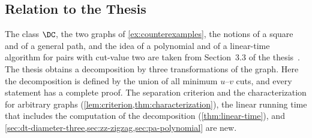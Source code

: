 \subsection{Relation to the Thesis}\label{sec:thesis}

The class $\DC$, the two graphs of \cref{ex:counterexamples}, the notions of a square and of a general path, and the idea of a polynomial and of a linear-time algorithm for pairs with cut-value two are taken from Section~3.3 of the thesis~\cite[Definitions~37 to~40 and Theorems~20, 22 and~23]{Michel2025MinCutPath}.
The thesis obtains a decomposition by three transformations of the graph.
Here the decomposition is defined by the union of all minimum $u$--$v$ cuts, and every statement has a complete proof.
The separation criterion and the characterization for arbitrary graphs (\cref{lem:criterion,thm:characterization}), the linear running time that includes the computation of the decomposition (\cref{thm:linear-time}), and \cref{sec:dt-diameter-three,sec:zz-zigzag,sec:pa-polynomial} are new.
